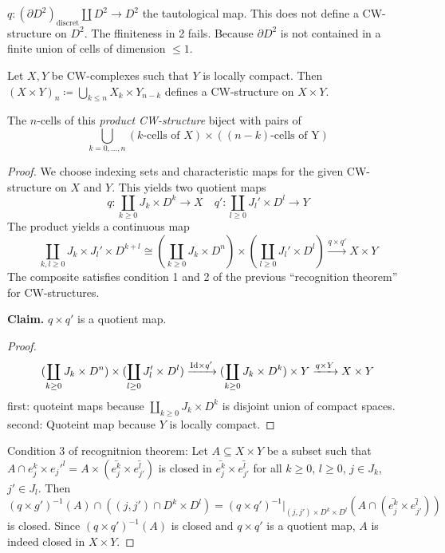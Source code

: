 \documentclass{TemplateLecture}
\begin{document}
\(q\colon (\partial D^2)_{\text{discret}} \amalg D^2 \to D^2\) the tautological map. This does not define a CW-structure on \(D^2\). The ffiniteness in 2 fails. Because \(\partial D^2\) is not contained in a finite union of cells of dimension \(\leq 1\).

\begin{thm}{}{}
    Let \(X,Y\) be CW-complexes such that \(Y\) is locally compact. Then \((X\times Y)_n \coloneq \bigcup_{k \leq n} X_k \times Y_{n-k}\) defines a CW-structure on \(X \times Y\).%

    The \(n\)-cells of this \emph{product CW-structure} biject with pairs of
    \[\bigcup_{k = 0, \dots, n} (k \text{-cells of } X) \times ((n-k)\text{-cells of Y})\]
\end{thm}
\begin{proof}
    We choose indexing sets and characteristic maps for the given CW-structure on \(X\) and \(Y\). This yields two quotient maps
    \[q\colon \coprod_{k \geq 0} J_k \times D^k \to X \quad q'\colon \coprod_{l \geq 0} J_l' \times D^l \to Y\]
    The product yields a continuous map
    \[\coprod_{k,l \geq 0} J_k \times J_l' \times D^{k+l} \cong (\coprod_{k \geq 0} J_k \times D^n) \times (\coprod_{l \geq 0} J_l' \times D^l) \xrightarrow{q\times q'} X\times Y\]
    The composite satisfies condition 1 and 2 of the previous \enquote{recognition theorem} for CW-structures.

    \textbf{Claim.} \(q\times q'\) is a quotient map.
    \begin{proof}
        \[(\coprod_{k \geq 0} J_k \times D^n) \times (\coprod_{l \geq 0} J'_l \times D^l) \xrightarrow{\mathrm{Id} \times q'} (\coprod_{k \geq 0} J_k \times D^k)\times Y \xrightarrow{q \times Y} X\times Y\]
        first: quoteint maps  because \(\coprod_{k \geq 0} J_k \times D^k\) is disjoint union of compact spaces.
        second: Quoteint map because \(Y\) is locally compact.
    \end{proof}
    Condition 3 of recognitnion theorem: Let \(A \subseteq X\times Y\) be a subset such that \(A \cap e_j^k \times e_j'^l = A \times (\bar{e_j^k} \times \bar{e_{j'}^l})\) is closed in \(\bar{e_j^k} \times \bar{e_{j'}^l}\) for all \(k \geq 0\), \(l \geq 0\), \(j \in J_k\), \(j' \in J_l\).
    Then \((q\times g')^{-1}(A) \cap ((j,j') \cap D^k \times D^l) = (q \times q')^{-1}\rvert_{(j,j') \times D^k \times D^l}(A \cap(\bar{e_j^k} \times \bar{e_{j'}^l}))\) is closed. Since \((q\times q')^{-1}(A)\) is closed and \(q\times q'\) is a quotient map, \(A \) is indeed closed in \(X \times Y\).
\end{proof}
\end{document}
